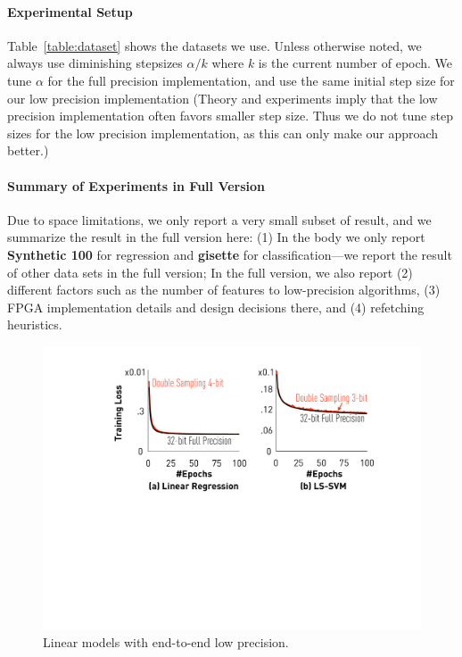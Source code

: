 \documentclass{article}
\begin{document}
\vspace{-1em}
\paragraph{Experimental Setup} 
Table~\ref{table:dataset} shows the 
datasets we use. 
Unless otherwise noted, we always
use diminishing stepsizes $\alpha/k$
where $k$ is the current number of
epoch. We tune 
$\alpha$ for the full precision
implementation, and use the
same initial step size for 
our low precision 
implementation (Theory and
experiments imply that the low precision
implementation often favors smaller step size. 
Thus we do not tune step sizes for the low precision 
implementation, as this can only make our 
approach better.) 

\vspace{-1em}
\paragraph*{Summary of Experiments in Full Version}
Due to space limitations, we only
report a very small subset of result, and
we summarize the result in the full
version here: (1) In the body we only report
{\bf Synthetic 100} for regression and 
{\bf gisette} for classification---we
report the result of other data sets 
in the full version; In the
full version, we also report (2) different
factors such as the number of features
to low-precision algorithms, (3) FPGA
implementation details and design
decisions there, and (4) refetching
heuristics.





\begin{figure}[t]
\centering
\includegraphics[width=0.7\columnwidth]{final-experiments/linearmodel} 
\vspace{-1em}
\caption{Linear models with end-to-end low precision.}
\label{fig:convergence}
\end{figure}
\end{document}
